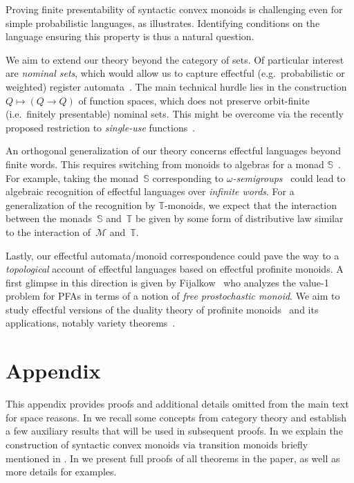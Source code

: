 \documentclass[a4paper, UKenglish, numberwithinsect, thm-restate, cleveref, final]{lipics-v2021}
\theoremstyle{plain}
\theoremstyle{definition}
\newcommand{\T}{\ensuremath{\mathbb{T}}\xspace}
\newcommand{\M}{\ensuremath{\mathcal{M}}\xspace}
\numberwithin{equation}{section}
\begin{document}
Proving finite presentability of syntactic convex monoids is challenging even for simple probabilistic languages, as  illustrates. Identifying conditions on the language ensuring this property is thus a natural question.

We aim to extend our theory beyond the category of sets. Of particular interest are \emph{nominal sets}, which would allow us to capture effectful (e.g.~probabilistic or weighted) register automata~\cite{bkl14}. The main technical hurdle lies in the construction $Q\mapsto (Q\to Q)$ of function spaces, which does not preserve orbit-finite (i.e.~finitely presentable) nominal sets. This might be overcome via the recently proposed restriction to \emph{single-use} functions~\cite{bs20,bns24}.

An orthogonal generalization of our theory concerns effectful languages beyond finite words. This requires switching from monoids to algebras for a monad $\mathbb{S}$~\cite{Bojan15}.
For example, taking the monad~$\mathbb{S}$ corresponding to \emph{\(\omega\)-semigroups}~\cite{pp04} could lead to algebraic recognition of effectful languages over \emph{infinite words}.
For a generalization of the recognition by $\T$-monoids, we expect that the interaction between the monads~$\mathbb{S}$ and~\(\T\) be given by some form of distributive law similar to the interaction of~\(\M\) and~\(\T\).

Lastly, our effectful automata/monoid correspondence could pave the way to a \emph{topological} account of effectful languages based on effectful profinite monoids. A first glimpse in this direction is given by Fijalkow~\cite{fijalkow-17} who analyzes the value-1 problem for PFAs in terms of a notion of \emph{free prostochastic monoid}. We aim to study effectful versions of the duality theory of profinite monoids~\cite{gehrke-13,bum24} and its applications, notably variety theorems~\cite{ggp08,uacm17}.



\clearpage
\appendix 

\section*{Appendix}

This appendix provides proofs and additional details omitted from the main text for space reasons. In  we recall some concepts from category theory and establish a few auxiliary results that will be used in subsequent proofs. In  we explain the construction of syntactic convex monoids via transition monoids briefly mentioned in . In  we present full proofs of all theorems in the paper, as well as more details for examples.
\end{document}
